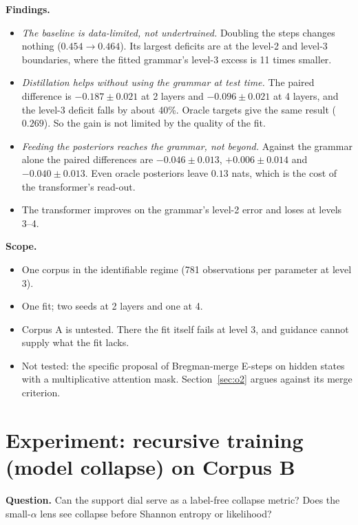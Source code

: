 \documentclass[11pt]{article}
\theoremstyle{definition}
\theoremstyle{remark}
\begin{document}
\noindent\textbf{Findings.}
\begin{itemize}
  \item \emph{The baseline is data-limited, not undertrained.} Doubling the steps changes nothing ($0.454\to0.464$). Its largest deficits are at the level-2 and level-3 boundaries, where the fitted grammar's level-3 excess is 11 times smaller.
  \item \emph{Distillation helps without using the grammar at test time.} The paired difference is $-0.187\pm0.021$ at 2 layers and $-0.096\pm0.021$ at 4 layers, and the level-3 deficit falls by about 40\%. Oracle targets give the same result ($0.269$). So the gain is not limited by the quality of the fit.
  \item \emph{Feeding the posteriors reaches the grammar, not beyond.} Against the grammar alone the paired differences are $-0.046\pm0.013$, $+0.006\pm0.014$ and $-0.040\pm0.013$. Even oracle posteriors leave $0.13$ nats, which is the cost of the transformer's read-out.
  \item The transformer improves on the grammar's level-2 error and loses at levels 3--4.
\end{itemize}

\noindent\textbf{Scope.}
\begin{itemize}
  \item One corpus in the identifiable regime (781 observations per parameter at level 3).
  \item One fit; two seeds at 2 layers and one at 4.
  \item Corpus A is untested. There the fit itself fails at level 3, and guidance cannot supply what the fit lacks.
  \item Not tested: the specific proposal of Bregman-merge E-steps on hidden states with a multiplicative attention mask. Section~\ref{sec:o2} argues against its merge criterion.
\end{itemize}

\section{Experiment: recursive training (model collapse) on Corpus B}\label{sec:collapse}
\textbf{Question.} Can the support dial serve as a label-free collapse metric? Does the small-$\alpha$ lens see collapse before Shannon entropy or likelihood?
\end{document}
